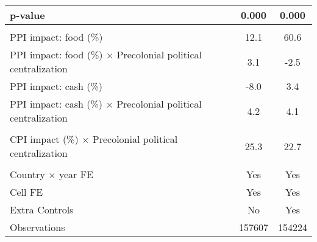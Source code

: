 {\begin{tabular}{l*{2}{c}}
\hspace{25pt} p-value&       0.000         &       0.000         \\
\hline \\ PPI impact: food (\%)&        12.1         &        60.6         \\
PPI impact: food (\%) $\times$ Precolonial political centralization&         3.1         &        -2.5         \\
PPI impact: cash (\%)&        -8.0         &         3.4         \\
PPI impact: cash (\%) $\times$ Precolonial political centralization&         4.2         &         4.1         \\
\\  CPI impact (\%) $\times$ Precolonial political centralization&        25.3         &        22.7         \\
\hline \\ Country $\times$ year FE&         Yes         &         Yes         \\
Cell FE             &         Yes         &         Yes         \\
Extra Controls      &          No         &         Yes         \\
Observations        &      157607         &      154224         \\
\hline\hline
\end{tabular}
}
